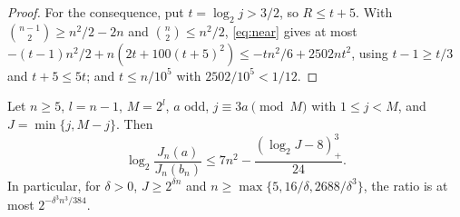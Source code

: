\begin{proof}
For the consequence, put $t=\log_2j>3/2$, so $R\le t+5$. With
$\binom{n-1}2\ge n^2/2-2n$ and $\binom n2\le n^2/2$, \eqref{eq:near} gives at
most $-(t-1)n^2/2+n(2t+100(t+5)^2)\le-tn^2/6+2502nt^2$, using $t-1\ge t/3$ and
$t+5\le5t$; and $t\le n/10^5$ with $2502/10^5<1/12$.
\end{proof}

\begin{proposition}\label{prop:far}
Let $n\ge5$, $l=n-1$, $M=2^l$, $a$ odd, $j\equiv3a\pmod M$ with $1\le j<M$, and
$J=\min\{j,M-j\}$. Then
\begin{equation}\label{eq:far}
 \log_2\frac{J_n(a)}{J_n(b_n)}\le7n^2-\frac{(\log_2J-8)_+^3}{24}.
\end{equation}
In particular, for $\delta>0$, $J\ge2^{\delta n}$ and
$n\ge\max\{5,16/\delta,2688/\delta^3\}$, the ratio is at most
$2^{-\delta^3n^3/384}$.
\end{proposition}

